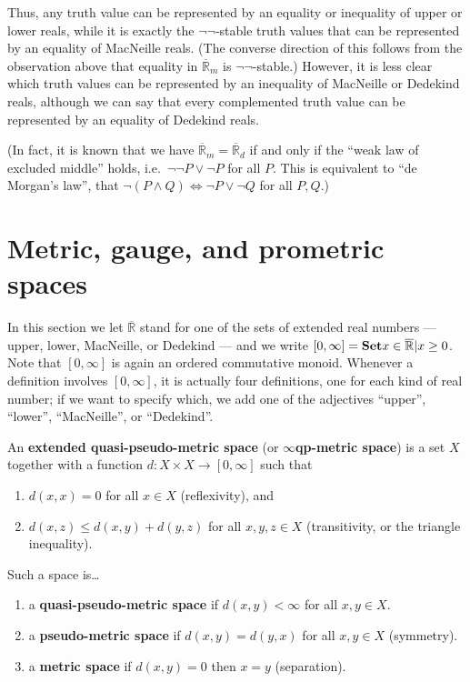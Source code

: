 \documentclass{article}
\def\R{\mathbb{R}}
\def\Re{\overline{\R}}
\def\Rp{[0,\infty]}
\def\Red{\Re_d}
\def\Rem{\Re_m}
\def\eqp{$\infty$qp}
\def\nn{\ensuremath{\neg\neg}}
\begin{document}
Thus, any truth value can be represented by an equality or inequality of upper or lower reals, while it is exactly the \nn-stable truth values that can be represented by an equality of MacNeille reals.
(The converse direction of this follows from the observation above that equality in $\Rem$ is \nn-stable.)
However, it is less clear which truth values can be represented by an inequality of MacNeille or Dedekind reals, although we can say that every complemented truth value can be represented by an equality of Dedekind reals.

(In fact, it is known that we have $\Rem = \Red$ if and only if the ``weak law of excluded middle'' holds, i.e.\ $\neg\neg P \lor \neg P$ for all $P$.
This is equivalent to ``de Morgan's law'', that $\neg (P\land Q) \iff \neg P \lor \neg Q$ for all $P,Q$.)


\section{Metric, gauge, and prometric spaces}
\label{sec:metric}

In this section we let $\Re$ stand for one of the sets of extended real numbers --- upper, lower, MacNeille, or Dedekind --- and we write $\Rp = \setof{x\in \Re | x \ge 0 }$.
Note that $\Rp$ is again an ordered commutative monoid.
Whenever a definition involves $\Rp$, it is actually four definitions, one for each kind of real number; if we want to specify which, we add one of the adjectives ``upper'', ``lower'', ``MacNeille'', or ``Dedekind''.

\begin{defn}
  An \textbf{extended quasi-pseudo-metric space} (or \textbf{\eqp-metric space}) is a set $X$ together with a function $d:X\times X \to \Rp$ such that
  \begin{enumerate}
  \item $d(x,x)=0$ for all $x\in X$ (reflexivity), and
  \item $d(x,z)\le d(x,y)+d(y,z)$ for all $x,y,z\in X$ (transitivity, or the triangle inequality).
  \end{enumerate}
  Such a space is\dots
  \begin{enumerate}[resume]
  \item a \textbf{quasi-pseudo-metric space} if $d(x,y)<\infty$ for all $x,y\in X$.
  \item a \textbf{pseudo-metric space} if $d(x,y)=d(y,x)$ for all $x,y\in X$ (symmetry).
  \item a \textbf{metric space} if $d(x,y)=0$ then $x=y$ (separation).
  \end{enumerate}
\end{defn}
\end{document}
